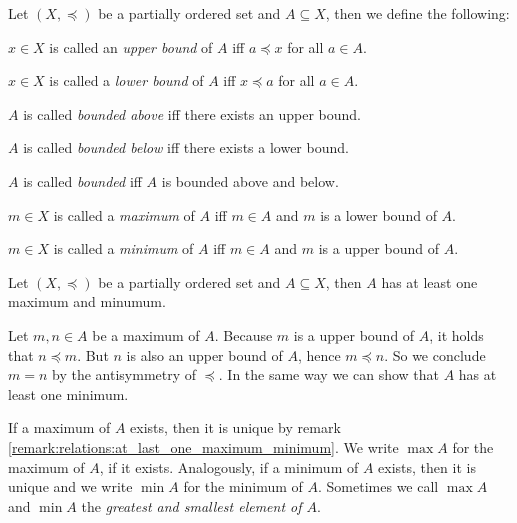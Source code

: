 \begin{definition}
    Let $(X,\preceq)$ be a partially ordered set and $A\subseteq X$, then we define the following:
    \begin{definitionenumerate}
        \item $x\in X$ is called an \emph{upper bound} of $A$ iff $a\preceq x$ for all $a\in A$.
        \item $x\in X$ is called a \emph{lower bound} of $A$ iff $x\preceq a$ for all $a\in A$.
        \item $A$ is called \emph{bounded above} iff there exists an upper bound.
        \item $A$ is called \emph{bounded below} iff there exists a lower bound.
        \item $A$ is called \emph{bounded} iff $A$ is bounded above and below.
        \item $m\in X$ is called a \emph{maximum} of $A$ iff $m\in A$ and $m$ is a lower bound of $A$.
        \item $m\in X$ is called a \emph{minimum} of $A$ iff $m\in A$ and $m$ is a upper bound of $A$.
    \end{definitionenumerate}
\end{definition}

\begin{remarks}
    \begin{remarkenumerate}
        \item\label{remark:relations:at_last_one_maximum_minimum} Let $(X,\preceq)$ be a partially ordered set and $A\subseteq X$, then $A$ has at least one maximum and minumum.
        \begin{miniproof}
            Let $m,n\in A$ be a maximum of $A$. Because $m$ is a upper bound of $A$, it holds that $n\preceq m$. But $n$ is also an upper bound of $A$, hence $m\preceq n$. So we conclude $m=n$ by the antisymmetry of $\preceq$. In the same way we can show that $A$ has at least one minimum.
        \end{miniproof}
        \item If a maximum of $A$ exists, then it is unique by remark \ref{remark:relations:at_last_one_maximum_minimum}. We write $\max A$ for the maximum of $A$, if it exists. Analogously, if a minimum of $A$ exists, then it is unique and we write $\min A$ for the minimum of $A$. Sometimes we call $\max A$ and $\min A$ the \emph{greatest and smallest element of $A$}.
    \end{remarkenumerate}
\end{remarks}

